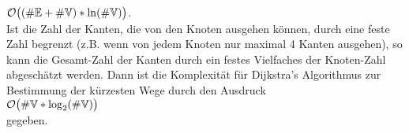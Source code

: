 \hspace*{1.3cm} $\mathcal{O}\bigl((\#{\mathbb E} + \#{\mathbb V}) * \ln(\#{\mathbb V})\bigr)$. \\[0.2cm]
Ist die Zahl der Kanten, die von den Knoten ausgehen k\"onnen, durch eine feste Zahl begrenzt
(z.B. wenn von jedem Knoten nur maximal 4 Kanten ausgehen), so
kann  die Gesamt-Zahl der Kanten durch ein festes Vielfaches der Knoten-Zahl abgesch\"atzt
werden.  Dann ist  die Komplexit\"at f\"ur Dijkstra's Algorithmus zur  Bestimmung der k\"urzesten Wege
durch den Ausdruck  
\\[0.2cm]
\hspace*{1.3cm}
$\mathcal{O}\bigl(\#{\mathbb V} * \log_2(\#{\mathbb V})\bigr)$ 
\\[0.2cm]
gegeben.




